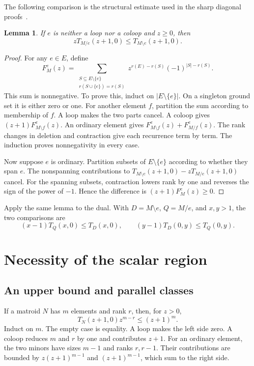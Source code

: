 \documentclass[11pt,a4paper]{article}
\newtheorem{lemma}[theorem]{Lemma}
\begin{document}
The following comparison is the structural estimate used in the sharp
diagonal proofs~\cite{Liu,CX}.
\begin{lemma}\label{lem:axis}
If $e$ is neither a loop nor a coloop and $z\geq0$, then
\[
zT_{M/e}(z+1,0)\leq T_{M\setminus e}(z+1,0).
\]
\end{lemma}
\begin{proof}
For any $e\in E$, define
\[
F_M^e(z)=\sum_{\substack{S\subseteq E\setminus\{e\}\\r(S\cup\{e\})=r(S)}}
z^{r(E)-r(S)}(-1)^{|S|-r(S)}.
\]
This sum is nonnegative. To prove this, induct on $|E\setminus\{e\}|$.
On a singleton ground set it is either zero or one. For another element
$f$, partition the sum according to membership of $f$. A loop makes the
two parts cancel. A coloop gives $(z+1)F_{M\setminus f}^e(z)$.
An ordinary element gives $F_{M\setminus f}^e(z)+F_{M/f}^e(z)$.
The rank changes in deletion and contraction give each recurrence term
by term. The induction proves nonnegativity in every case.

Now suppose $e$ is ordinary. Partition subsets of $E\setminus\{e\}$
according to whether they span $e$. The nonspanning contributions to
$T_{M\setminus e}(z+1,0)-zT_{M/e}(z+1,0)$ cancel. For the spanning
subsets, contraction lowers rank by one and reverses the sign of the
power of $-1$. Hence the difference is $(z+1)F_M^e(z)\geq0$.
\end{proof}

Apply the same lemma to the dual. With $D=M\setminus e$, $Q=M/e$, and
$x,y>1$, the two comparisons are
\begin{equation}\label{eq:axis-pair}
(x-1)T_Q(x,0)\leq T_D(x,0),\qquad
(y-1)T_D(0,y)\leq T_Q(0,y).
\end{equation}

\section{Necessity of the scalar region}

\subsection{An upper bound and parallel classes}
If a matroid $N$ has $m$ elements and rank $r$, then, for $z>0$,
\begin{equation}\label{eq:rank-upper}
T_N(z+1,0)z^{m-r}\leq(z+1)^m.
\end{equation}
Induct on $m$. The empty case is equality. A loop makes the left side
zero. A coloop reduces $m$ and $r$ by one and contributes $z+1$.
For an ordinary element, the two minors have sizes $m-1$ and ranks
$r,r-1$. Their contributions are bounded by
$z(z+1)^{m-1}$ and $(z+1)^{m-1}$, which sum to the right side.
\end{document}
